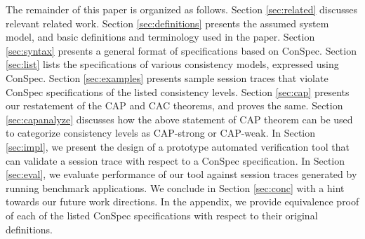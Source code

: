 \documentclass[journal,compsoc]{IEEEtran}
\begin{document}
The remainder of this paper is organized as follows. Section \ref{sec:related} discusses relevant related work. Section  \ref{sec:definitions} presents the assumed system model, and basic definitions and terminology used in the paper.  Section \ref{sec:syntax} presents a general format of specifications based on ConSpec. Section \ref{sec:list} lists the specifications of various  consistency models, expressed using ConSpec. Section  \ref{sec:examples} presents sample session traces that violate    ConSpec specifications of the listed consistency levels. %
 Section \ref{sec:cap} presents our restatement of the CAP and CAC theorems, and proves the same.  Section \ref{sec:capanalyze} discusses how the above statement of CAP theorem can be used to categorize consistency levels as CAP-strong or CAP-weak. %
 In Section \ref{sec:impl}, we present the design of a prototype automated verification tool that can validate a session trace with respect to a ConSpec specification. In Section  \ref{sec:eval}, we evaluate performance of our tool against session traces generated by running benchmark applications. We conclude in Section \ref{sec:conc} with a hint towards our future work directions.  %
  In the appendix, we provide equivalence proof of each of the listed ConSpec specifications with respect to their original definitions. 
 
\end{document}

